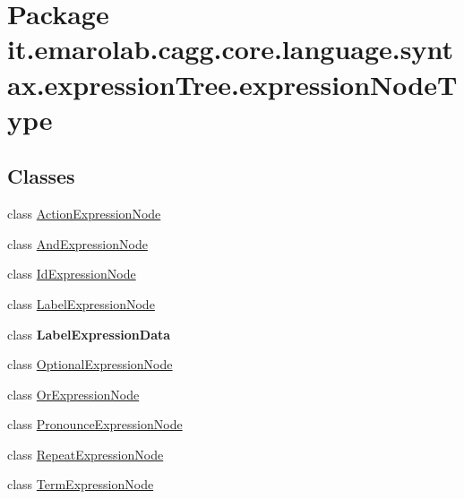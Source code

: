 \hypertarget{namespaceit_1_1emarolab_1_1cagg_1_1core_1_1language_1_1syntax_1_1expressionTree_1_1expressionNodeType}{\section{Package it.\-emarolab.\-cagg.\-core.\-language.\-syntax.\-expression\-Tree.\-expression\-Node\-Type}
\label{namespaceit_1_1emarolab_1_1cagg_1_1core_1_1language_1_1syntax_1_1expressionTree_1_1expressionNodeType}
}
\subsection*{Classes}
\begin{DoxyCompactItemize}
\item 
class \hyperlink{classit_1_1emarolab_1_1cagg_1_1core_1_1language_1_1syntax_1_1expressionTree_1_1expressionNodeType_1_1ActionExpressionNode}{Action\-Expression\-Node}
\item 
class \hyperlink{classit_1_1emarolab_1_1cagg_1_1core_1_1language_1_1syntax_1_1expressionTree_1_1expressionNodeType_1_1AndExpressionNode}{And\-Expression\-Node}
\item 
class \hyperlink{classit_1_1emarolab_1_1cagg_1_1core_1_1language_1_1syntax_1_1expressionTree_1_1expressionNodeType_1_1IdExpressionNode}{Id\-Expression\-Node}
\item 
class \hyperlink{classit_1_1emarolab_1_1cagg_1_1core_1_1language_1_1syntax_1_1expressionTree_1_1expressionNodeType_1_1LabelExpressionNode}{Label\-Expression\-Node}
\item 
class {\bfseries Label\-Expression\-Data}
\item 
class \hyperlink{classit_1_1emarolab_1_1cagg_1_1core_1_1language_1_1syntax_1_1expressionTree_1_1expressionNodeType_1_1OptionalExpressionNode}{Optional\-Expression\-Node}
\item 
class \hyperlink{classit_1_1emarolab_1_1cagg_1_1core_1_1language_1_1syntax_1_1expressionTree_1_1expressionNodeType_1_1OrExpressionNode}{Or\-Expression\-Node}
\item 
class \hyperlink{classit_1_1emarolab_1_1cagg_1_1core_1_1language_1_1syntax_1_1expressionTree_1_1expressionNodeType_1_1PronounceExpressionNode}{Pronounce\-Expression\-Node}
\item 
class \hyperlink{classit_1_1emarolab_1_1cagg_1_1core_1_1language_1_1syntax_1_1expressionTree_1_1expressionNodeType_1_1RepeatExpressionNode}{Repeat\-Expression\-Node}
\item 
class \hyperlink{classit_1_1emarolab_1_1cagg_1_1core_1_1language_1_1syntax_1_1expressionTree_1_1expressionNodeType_1_1TermExpressionNode}{Term\-Expression\-Node}
\end{DoxyCompactItemize}
